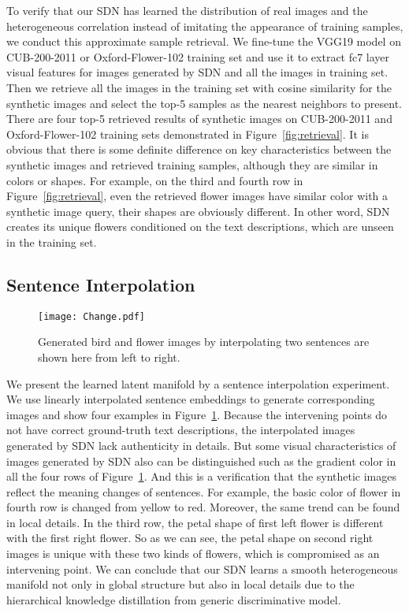\documentclass[sigconf]{acmart}
\begin{document}
To verify that our SDN has learned the distribution of real images and the heterogeneous correlation instead of imitating the appearance of training samples, we conduct this approximate sample retrieval. We fine-tune the VGG19 model on CUB-200-2011 or Oxford-Flower-102 training set and use it to extract fc7 layer visual features for images generated by SDN and all the images in training set. Then we retrieve all the images in the training set with cosine similarity for the synthetic images and select the top-5 samples as the nearest neighbors to present. There are four top-5 retrieved results of synthetic images on CUB-200-2011 and Oxford-Flower-102 training sets demonstrated in Figure~\ref{fig:retrieval}. It is obvious that there is some definite difference on key characteristics between the synthetic images and retrieved training samples, although they are similar in colors or shapes. For example, on the third and fourth row in Figure~\ref{fig:retrieval}, even the retrieved flower images have similar color with a synthetic image query, their shapes are obviously different. In other word, SDN creates its unique flowers conditioned on the text descriptions, which are unseen in the training set.

\subsection{Sentence Interpolation}

\begin{figure}[t]
	\begin{center}
		\texttt{[image: Change.pdf]}
	\end{center}
	\caption{Generated bird and flower images by interpolating two sentences are shown here from left to right.}
	\label{fig:change}
\end{figure}

We present the learned latent manifold by a sentence interpolation experiment. We use linearly interpolated sentence embeddings to generate corresponding images and show four examples in Figure~\ref{fig:change}. Because the intervening points do not have correct ground-truth text descriptions, the interpolated images generated by SDN lack authenticity in details. But some visual characteristics of images generated by SDN also can be distinguished such as the gradient color in all the four rows of Figure~\ref{fig:change}. And this is a verification that the synthetic images reflect the meaning changes of sentences. For example, the basic color of flower in fourth row is changed from yellow to red. Moreover, the same trend can be found in local details. In the third row, the petal shape of first left flower is different with the first right flower. So as we can see, the petal shape on second right images is unique with these two kinds of flowers, which is compromised as an intervening point. We can conclude that our SDN learns a smooth heterogeneous manifold not only in global structure but also in local details due to the hierarchical knowledge distillation from generic discriminative model.
\end{document}
